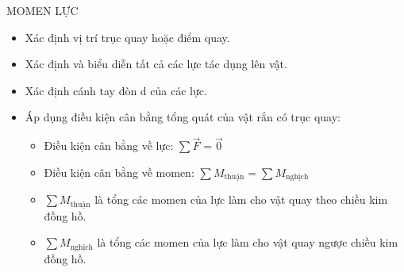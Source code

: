 \begin{dang}{MOMEN LỰC}
\begin{itemize}
\item Xác định vị trí trục quay hoặc điểm quay.
\item Xác định và biểu diễn tất cả các lực tác dụng lên vật.
\item Xác định cánh tay đòn d của các lực.
\item Áp dụng điều kiện cân bằng tổng quát của vật rắn có trục quay:
\begin{itemize}
\item Điều kiện cân bằng về lực: $\sum{\vec{F}}=\vec 0$
\item Điều kiện cân bằng về momen: $\sum M_{\text{thuận}}=\sum M_{\text{nghịch}}$
\item $\sum M_{\text{thuận}}$ là tổng các momen của lực làm cho vật quay theo chiều kim đồng hồ. 
\item $\sum M_{\text{nghịch}}$ là tổng các momen của lực làm cho vật quay ngược chiều kim đồng hồ.
\end{itemize}
\end{itemize}
\end{dang}